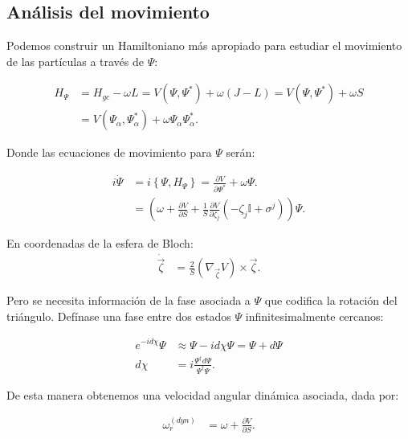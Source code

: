 \documentclass[xcolor=dvipsnames]{beamer}
\newcommand{\roundP}[1]{\left( #1 \right)}
\newcommand{\poisson}[2]{\left\lbrace #1, #2 \right\rbrace}
\begin{document}
\subsection{Análisis del movimiento}
\begin{frame}
Podemos construir un Hamiltoniano más apropiado para estudiar el movimiento de las partículas a través de $\Psi$:

\begin{align*}
H_{\Psi} &= H_{gc} - \omega L =  V\roundP{\Psi,\Psi^*}+ \omega (J-L) = V\roundP{\Psi,\Psi^*}+ \omega S\\
&= V\roundP{\Psi_\alpha,\Psi_\alpha^*}+ \omega\Psi_\alpha\Psi^*_\alpha.
\end{align*}

Donde las ecuaciones de movimiento para $\Psi$ serán:

\begin{align*}
i\dot{\Psi} &= i\poisson{\Psi}{H_{\Psi}} = \frac{\partial V}{\partial \Psi^*} + \omega \Psi.\\
&= \roundP{\omega +\frac{\partial V}{\partial S}+ \frac{1}{S}\frac{\partial V}{\partial \zeta_j}\roundP{-\zeta_j \mathbb{I}  + \sigma^j }}\Psi.
\end{align*}

\end{frame}
\begin{frame}
En coordenadas de la esfera de Bloch:
\begin{align*}
\dot{\vec{\zeta}} &= \frac{2}{S}\roundP{\nabla_{\vec{\zeta}}V}\times\vec{\zeta}. 
\end{align*}

Pero se necesita información de la fase asociada a $\Psi$ que codifica la rotación del triángulo. Defínase una fase entre dos estados $\Psi$ infinitesimalmente cercanos:

\begin{align*}
e^{-id\chi}\Psi &\approx \Psi -id\chi\Psi = \Psi + d\Psi\\
d\chi &= i\frac{\Psi^\dagger d\Psi}{\Psi^\dagger\Psi}.
\end{align*}

De esta manera obtenemos una velocidad angular dinámica asociada, dada por:

\begin{align*}
\omega_r^{(dyn)} &= \omega + \frac{\partial V}{\partial S}.
\end{align*}

\end{frame}
\end{document}
